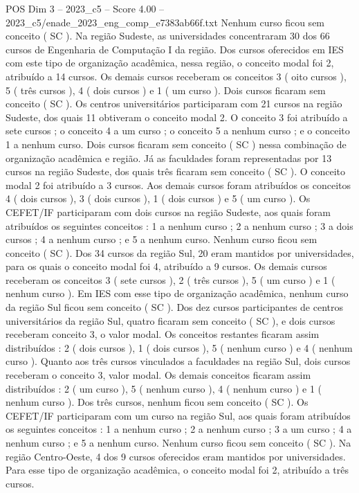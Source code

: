 \begin{textsample}{POS Dim 3 – 2023\_c5 – Score 4.00 – 2023\_c5/enade\_2023\_eng\_comp\_e7383ab66f.txt}
Nenhum curso ficou sem conceito ( SC ).
Na região Sudeste, as universidades concentraram 30 dos 66 cursos de Engenharia de Computação I da região.
Dos cursos oferecidos em IES com este tipo de organização acadêmica, nessa região, o conceito modal foi 2, atribuído a 14 cursos.
Os demais cursos receberam os conceitos 3 ( oito cursos ), 5 ( três cursos ), 4 ( dois cursos ) e 1 ( um curso ).
Dois cursos ficaram sem conceito ( SC ).
Os centros universitários participaram com 21 cursos na região Sudeste, dos quais 11 obtiveram o conceito modal 2.
O conceito 3 foi atribuído a sete cursos ; o conceito 4 a um curso ; o conceito 5 a nenhum curso ; e o conceito 1 a nenhum curso.
Dois cursos ficaram sem conceito ( SC ) nessa combinação de organização acadêmica e região.
Já as faculdades foram representadas por 13 cursos na região Sudeste, dos quais três ficaram sem conceito ( SC ).
O conceito modal 2 foi atribuído a 3 cursos.
Aos demais cursos foram atribuídos os conceitos 4 ( dois cursos ), 3 ( dois cursos ), 1 ( dois cursos ) e 5 ( um curso ).
Os CEFET/IF participaram com dois cursos na região Sudeste, aos quais foram atribuídos os seguintes conceitos : 1 a nenhum curso ; 2 a nenhum curso ; 3 a dois cursos ; 4 a nenhum curso ; e 5 a nenhum curso.
Nenhum curso ficou sem conceito ( SC ).
Dos 34 cursos da região Sul, 20 eram mantidos por universidades, para os quais o conceito modal foi 4, atribuído a 9 cursos.
Os demais cursos receberam os conceitos 3 ( sete cursos ), 2 ( três cursos ), 5 ( um curso ) e 1 ( nenhum curso ).
Em IES com esse tipo de organização acadêmica, nenhum curso da região Sul ficou sem conceito ( SC ).
Dos dez cursos participantes de centros universitários da região Sul, quatro ficaram sem conceito ( SC ), e dois cursos receberam conceito 3, o valor modal.
Os conceitos restantes ficaram assim distribuídos : 2 ( dois cursos ), 1 ( dois cursos ), 5 ( nenhum curso ) e 4 ( nenhum curso ).
Quanto aos três cursos vinculados a faculdades na região Sul, dois cursos receberam o conceito 3, valor modal.
Os demais conceitos ficaram assim distribuídos : 2 ( um curso ), 5 ( nenhum curso ), 4 ( nenhum curso ) e 1 ( nenhum curso ).
Dos três cursos, nenhum ficou sem conceito ( SC ).
Os CEFET/IF participaram com um curso na região Sul, aos quais foram atribuídos os seguintes conceitos : 1 a nenhum curso ; 2 a nenhum curso ; 3 a um curso ; 4 a nenhum curso ; e 5 a nenhum curso.
Nenhum curso ficou sem conceito ( SC ).
Na região Centro-Oeste, 4 dos 9 cursos oferecidos eram mantidos por universidades.
Para esse tipo de organização acadêmica, o conceito modal foi 2, atribuído a três cursos.

\end{textsample}
